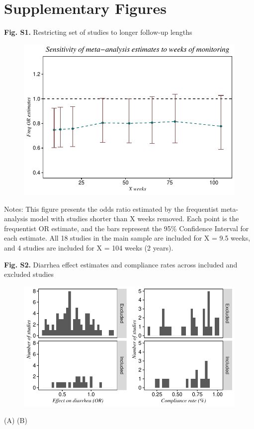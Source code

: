 \documentclass[12pt]{article}
\begin{document}
\section*{Supplementary Figures}

\noindent\textbf{Fig. S1.} Restricting set of studies to longer follow-up lengths

\begin{figure}[H]
    \centering
    \includegraphics{figures/ma-week-plot.pdf}
\end{figure}

\noindent\fontsize{10}{10}\selectfont Notes: This figure presents the odds ratio estimated by the frequentist meta-analysis model with studies shorter than X weeks removed. Each point is the frequentist OR estimate, and the bars represent the 95\% Confidence Interval for each estimate. All 18 studies in the main sample are included for X = 9.5 weeks, and 4 studies are included for X = 104 weeks (2 years).

\newpage	
\noindent\textbf{Fig. S2.} Diarrhea effect estimates and compliance rates across included and excluded studies
\begin{figure}[H]
    \centering
    \includegraphics{figures/fig-compliance-diarr-hist.pdf}
\end{figure}
\noindent\hspace{1.0in}(A)
\noindent\hspace{3.0in}(B)\par
\end{document}
